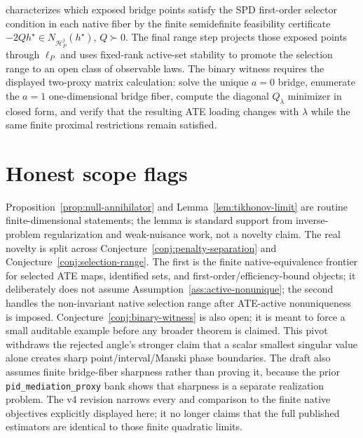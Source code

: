 \documentclass[11pt]{article}
\newcommand{\calH}{\mathcal{H}}
\theoremstyle{definition}
\theoremstyle{plain}
\theoremstyle{remark}
\begin{document}
characterizes which exposed bridge points satisfy the SPD first-order selector
condition in each native fiber by the finite semidefinite feasibility
certificate \(-2Qh^\star\in N_{\calH_P^j}(h^\star)\), \(Q\succ0\).
The final range step projects those exposed points through \(\ell_P\) and
uses fixed-rank active-set stability to promote the selection range to an
open class of observable laws.  The binary witness
requires the displayed two-proxy matrix calculation: solve the unique
\(a=0\) bridge, enumerate the \(a=1\) one-dimensional bridge fiber, compute
the diagonal \(Q_\lambda\) minimizer in closed form, and verify that the
resulting ATE loading changes with \(\lambda\) while the same finite proximal
restrictions remain satisfied.

\section{Honest scope flags}
Proposition~\ref{prop:null-annihilator} and Lemma~\ref{lem:tikhonov-limit} are
routine finite-dimensional statements; the lemma is standard support from
inverse-problem regularization and weak-nuisance work, not a novelty claim.
The real novelty is split across Conjecture~\ref{conj:penalty-separation}
and Conjecture~\ref{conj:selection-range}.  The first is the finite
native-equivalence frontier for selected ATE maps, identified sets, and
first-order/efficiency-bound objects; it deliberately does not assume
Assumption~\ref{ass:active-nonunique}; the second handles the non-invariant
native selection range after ATE-active nonuniqueness is imposed.
Conjecture~\ref{conj:binary-witness} is also open; it is meant to force a
small auditable example before any broader theorem is claimed.  This pivot
withdraws the rejected angle's stronger claim that a scalar smallest singular
value alone creates sharp point/interval/Manski phase boundaries.  The draft
also assumes finite bridge-fiber sharpness rather than proving it, because
the prior \texttt{pid\_mediation\_proxy} bank shows that sharpness is a
separate realization problem.  The v4 revision narrows every
\citet{CuiPuShiMiaoTchetgen2024JASA} and
\citet{KallusMaoUehara2021MinimaxNC} comparison to the finite native
objectives explicitly displayed here; it no longer claims that the full
published estimators are identical to those finite quadratic limits.
\end{document}
